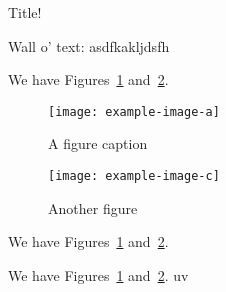 \documentclass{article}
\begin{document}
\begin{center}
    Title!
\end{center}

Wall o' text: asdfkakljdsfh

\blindtext

We have Figures~\ref{fig:caption-a} and~\ref{fig:caption-c}.

\begin{figure}[ht]
  \centering\texttt{[image: example-image-a]}
  \caption{A figure caption}\label{fig:caption-a}
\end{figure}

\begin{figure}[ht]
  \centering\texttt{[image: example-image-c]}
  \caption{Another figure}\label{fig:caption-c}
\end{figure}

We have Figures~\ref{fig:caption-a} and~\ref{fig:caption-c}.

\pagebreak
We have Figures~\ref{fig:caption-a} and~\ref{fig:caption-c}. uv
\end{document}
